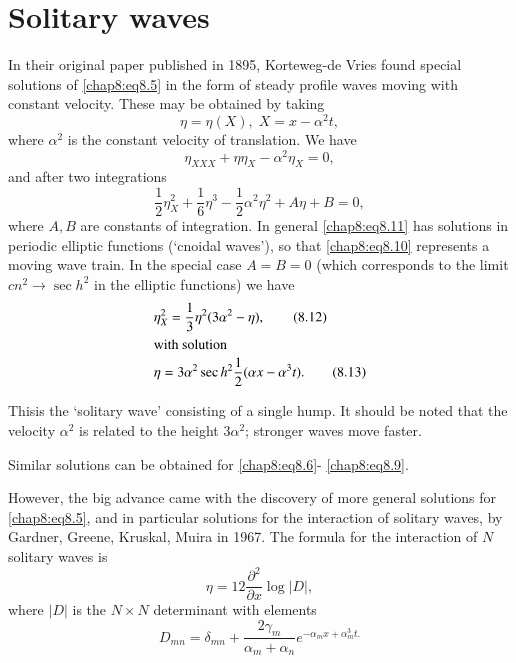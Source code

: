 \section{Solitary waves}\label{chap8:sec8.1}

In their original paper \cite{key16} published in 1895, Korteweg-de Vries found special solutions of \eqref{chap8:eq8.5} in the form of steady profile waves moving with constant velocity. These may be obtained by taking 
\begin{equation}
\eta=\eta(X),\;X=x-\alpha^2t,\tag{8.10}\label{chap8:eq8.10}
\end{equation}
where $\alpha^2$ is the constant velocity of translation. We have 
$$
\eta_{XXX}+\eta\eta_X-\alpha^2\eta_X=0,
$$
and after two integrations
\begin{equation}
\frac{1}{2}\eta_X^2 +\frac{1}{6}\eta^3 -\frac{1}{2}\alpha^2\eta^2 +A\eta+B=0, \tag{8.11}\label{chap8:eq8.11}
\end{equation}
where $A,B$ are constants of integration. In general \eqref{chap8:eq8.11} has solutions in periodic elliptic functions (`cnoidal waves'), so that \eqref{chap8:eq8.10} represents a moving wave train. In the special case $A=B=0$ (which corresponds to the limit $cn^2\to\sec h^2$ in the elliptic functions) we have 
\begin{align}
& \eta^2_X=\frac{1}{3}\eta^2(3\alpha^2-\eta),\tag{8.12}\label{chap8:eq8.12}\\
\intertext{with solution}
& \eta=3\alpha^2\sec h^2\frac{1}{2}(\alpha x-\alpha^3 t). \tag{8.13}\label{chap8:eq8.13}
\end{align}

This\pageoriginale is the `solitary wave' consisting of a single hump. It should be noted that the velocity $\alpha^2$ is related to the height $3\alpha^2$; stronger waves move faster. 

Similar solutions can be obtained for \eqref{chap8:eq8.6}- \eqref{chap8:eq8.9}.

However, the big advance came with the discovery of more general solutions for \eqref{chap8:eq8.5}, and in particular solutions for the interaction of solitary waves, by Gardner, Greene, Kruskal, Muira \cite{key17} in 1967. The formula for the interaction of $N$ solitary waves is 
\begin{equation}
\eta=12\frac{\partial^2}{\partial x}\log |D|,\tag{8.14}\label{chap8:eq8.14}
\end{equation}
where $|D|$ is the $N\times N$ determinant with elements
\begin{equation}
D_{mn}=\delta_{mn}+\frac{2\gamma_m}{\alpha_m +\alpha_n} e^{-\alpha_m x+\alpha_m^3 t.}\tag{8.15}\label{chap8:eq8.15}
\end{equation}

